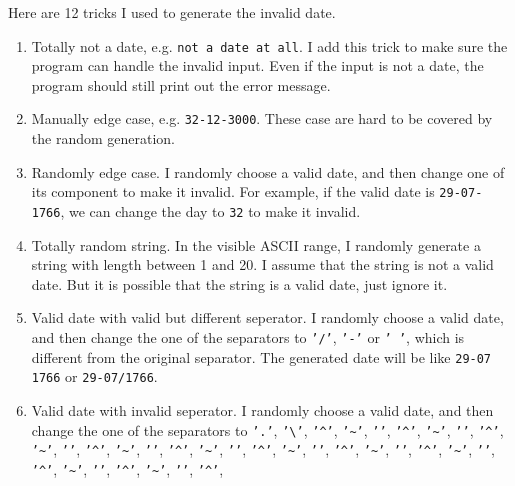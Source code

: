 \documentclass[a4paper,12pt]{article} %
\begin{document}
Here are 12 tricks I used to generate the invalid date.

\begin{enumerate}
    \item Totally not a date, e.g. \texttt{not a date at all}. 
        I add this trick to make sure the program can handle the invalid input. Even if the input is not a date,
        the program should still print out the error message.
    \item Manually edge case, e.g. \texttt{32-12-3000}. These case are hard to be covered by the random generation.
    \item Randomly edge case. I randomly choose a valid date, and then change one of its component to make it invalid.
        For example, if the valid date is \texttt{29-07-1766}, we can change the day to \texttt{32} to make it invalid.
    \item Totally random string. In the visible ASCII range, I randomly generate a string with length between 1 and 20.
        I assume that the string is not a valid date. But it is possible that the string is a valid date, just ignore it.
    \item Valid date with valid but different seperator. I randomly choose a valid date, and then change the one of the separators to 
        \texttt{'/'}, \texttt{'-'} or \texttt{' '}, which is different from the original separator. 
        The generated date will be like \texttt{29-07 1766} or \texttt{29-07/1766}.
    \item Valid date with invalid seperator. I randomly choose a valid date, and then change the one of the separators to 
        \texttt{'.'}, \texttt{'\textbackslash'}, \texttt{'\textasciicircum'}, \texttt{'\textasciitilde'}, \texttt{'\textasciigrave'}, 
        \texttt{'\textasciicircum'}, \texttt{'\textasciitilde'}, \texttt{'\textasciigrave'}, \texttt{'\textasciicircum'}, 
        \texttt{'\textasciitilde'}, \texttt{'\textasciigrave'}, \texttt{'\textasciicircum'}, \texttt{'\textasciitilde'}, 
        \texttt{'\textasciigrave'}, \texttt{'\textasciicircum'}, \texttt{'\textasciitilde'}, \texttt{'\textasciigrave'}, 
        \texttt{'\textasciicircum'}, \texttt{'\textasciitilde'}, \texttt{'\textasciigrave'}, \texttt{'\textasciicircum'}, 
        \texttt{'\textasciitilde'}, \texttt{'\textasciigrave'}, \texttt{'\textasciicircum'}, \texttt{'\textasciitilde'}, 
        \texttt{'\textasciigrave'}, \texttt{'\textasciicircum'}, \texttt{'\textasciitilde'}, \texttt{'\textasciigrave'}, 
        \texttt{'\textasciicircum'}, \texttt{'\textasciitilde'}, \texttt{'\textasciigrave'}, \texttt{'\textasciicircum'}, 

\end{enumerate}
\end{document}
